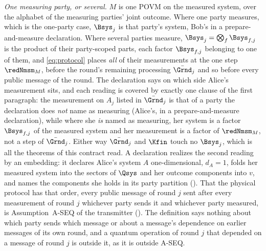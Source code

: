 \begin{definition}
\emph{One measuring party, or several.} $M$ is one POVM on the measured
system, over the alphabet of the measuring parties' joint outcome. Where one
party measures, which is the one-party case, $\Bsys_j$ is that party's
system, Bob's in a prepare-and-measure declaration. Where several parties
measure, $\Bsys_j=\bigotimes_f\Bsys_{f,j}$ is the product of their
party-scoped parts, each factor $\Bsys_{f,j}$ belonging to one of them, and
\eqref{eq:protocol} places \emph{all} of their measurements at the one step
$\redNmsm_M$, before the round's remaining processing $\bar{\Grnd}_j$ and so
before every public message of the round.
The declaration says on which side Alice's measurement sits, and each reading
is covered by exactly one clause of the first paragraph: the measurement on
$A_j$ listed in $\bar{\Grnd}_j$ is that of a party the declaration does
\emph{not} name as measuring (Alice's, in a prepare-and-measure declaration),
while where she \emph{is} named as measuring, her system is a factor
$\Bsys_{f,j}$ of the measured system and her measurement is a factor of
$\redNmsm_M$, not a step of $\bar{\Grnd}_j$. Either way $\bar{\Grnd}_j$ and
$\Kfin$ touch no $\Bsys_j$, which is all the theorems of this contract read.
A declaration realizes the second reading by an embedding: it declares
Alice's system $A$
one-dimensional, $d_A=1$, folds her measured system into the sectors of
$\Qsys$ and her outcome components into $v$, and names the components she
holds in its party partition (). That the
physical protocol has that order, every public message of round $j$ sent after
every measurement of round $j$ whichever party sends it and whichever party
measured, is Assumption~A-SEQ of the transmitter
(). The definition says nothing about which party
sends which message or about a message's dependence on earlier messages of
its own round, and a quantum operation of round $j$ that depended on a
message of round $j$ is outside it, as it is outside A-SEQ.
\end{definition}
